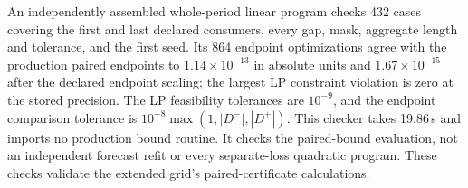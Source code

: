 An independently assembled whole-period linear program checks 432 cases
covering the first and last declared consumers, every gap, mask, aggregate
length and tolerance, and the first seed. Its 864 endpoint optimizations
agree with the production paired endpoints to $1.14\times10^{-13}$ in
absolute units and $1.67\times10^{-15}$ after the declared endpoint scaling;
the largest LP constraint violation is zero at the stored precision.
The LP feasibility tolerances are $10^{-9}$, and the endpoint comparison
tolerance is $10^{-8}\max(1,|D^-|,|D^+|)$. This checker takes 19.86\,s and
imports no production bound routine. It checks the paired-bound evaluation,
not an independent forecast refit or every separate-loss quadratic program.
These checks validate the extended grid's paired-certificate calculations.
